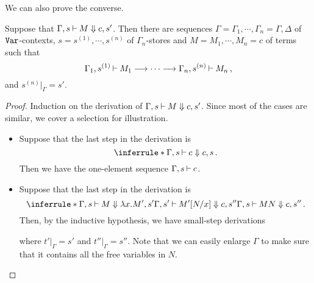 We can also prove the converse.

\begin{proposition}
  Suppose that $\Gamma,s\mathbin{\vdash} M\Downarrow c,s'$.  
  Then there are sequences $\Gamma=\Gamma_1,\cdots,\Gamma_n=\Gamma,\Delta$ of ${\mathtt{Var}}$-contexts, $s=s^{(1)},\cdots,s^{(n)}$ of $\Gamma_n$-stores and $M=M_1,\cdots,M_n=c$ of terms such that
  \[
    \Gamma_1,s^{(1)}\mathbin{\vdash} M_1 \longrightarrow \cdots \longrightarrow \Gamma_n,s^{(n)}\mathbin{\vdash} M_n\,,
    \]
  and $s^{(n)}\vert_{\Gamma}=s'$.
  \label{PropBigToSmall}
\end{proposition}
\begin{proof}
  Induction on the derivation of $\Gamma,s\mathbin{\vdash} M\Downarrow c,s'$.  
  Since most of the cases are similar, we cover a selection for illustration.

  \begin{itemize}
    \item Suppose that the last step in the derivation is
      \[
        \inferrule*{ }
        {\Gamma,s\ts c\converges c,s}\,.
        \]
      Then we have the one-element sequence $\Gamma,s\mathbin{\vdash} c$.  
    \item Suppose that the last step in the derivation is
      \[
        \inferrule*
        {
          \Gamma,s\ts M\converges \lambda x.M',s' \\ \Gamma,s' \ts M'[N/x]\converges c,s''
        }
        {
          \Gamma,s \ts MN\converges c,s''
        }\,.
        \]
      Then, by the inductive hypothesis, we have small-step derivations
      where $t'\vert_\Gamma=s'$ and $t''\vert_\Gamma=s''$.
      Note that we can easily enlarge $\Gamma$ to make sure that it contains all the free variables in $N$.


\end{itemize}
\end{proof}
